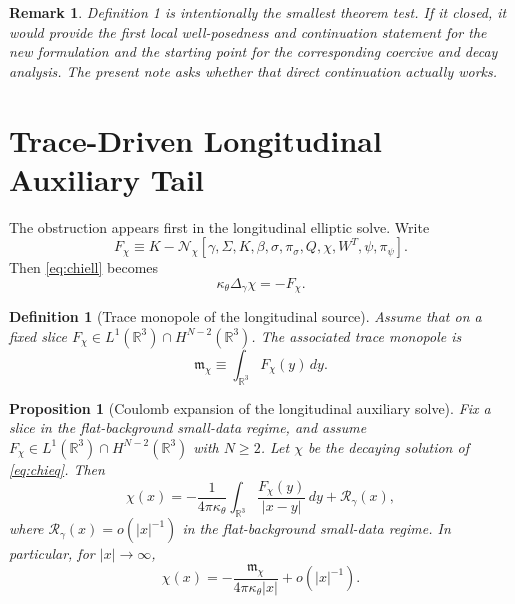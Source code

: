\documentclass[11pt]{article}
\newtheorem{definition}{Definition}
\newtheorem{proposition}{Proposition}
\newtheorem{remark}{Remark}
\begin{document}
\begin{remark}
Definition 1 is intentionally the smallest theorem test. If it closed, it would provide the first local well-posedness and continuation statement for the new formulation and the starting point for the corresponding coercive and decay analysis. The present note asks whether that direct continuation actually works.
\end{remark}

\section{Trace-Driven Longitudinal Auxiliary Tail}

The obstruction appears first in the longitudinal elliptic solve. Write
\begin{equation}
F_\chi
\equiv
K-\mathcal N_\chi[\gamma,\Sigma,K,\beta,\sigma,\pi_\sigma,Q,\chi,W^T,\psi,\pi_\psi].
\label{eq:Fchi}
\end{equation}
Then \eqref{eq:chiell} becomes
\begin{equation}
\kappa_\theta \Delta_\gamma \chi = -F_\chi.
\label{eq:chieq}
\end{equation}

\begin{definition}[Trace monopole of the longitudinal source]
Assume that on a fixed slice \(F_\chi \in L^1(\mathbb R^3)\cap H^{N-2}(\mathbb R^3)\). The associated \emph{trace monopole} is
\begin{equation}
\mathfrak m_\chi
\equiv
\int_{\mathbb R^3} F_\chi(y)\,dy.
\label{eq:mchi}
\end{equation}
\end{definition}

\begin{proposition}[Coulomb expansion of the longitudinal auxiliary solve]
\label{prop:coulomb}
Fix a slice in the flat-background small-data regime, and assume \(F_\chi \in L^1(\mathbb R^3)\cap H^{N-2}(\mathbb R^3)\) with \(N\ge 2\). Let \(\chi\) be the decaying solution of \eqref{eq:chieq}. Then
\begin{equation}
\chi(x)
=
-\frac{1}{4\pi\kappa_\theta}
\int_{\mathbb R^3}\frac{F_\chi(y)}{|x-y|}\,dy
+ \mathcal R_\gamma(x),
\label{eq:greenrep}
\end{equation}
where \(\mathcal R_\gamma(x)=o(|x|^{-1})\) in the flat-background small-data regime. In particular, for \(|x|\to\infty\),
\begin{equation}
\chi(x)
=
-\frac{\mathfrak m_\chi}{4\pi\kappa_\theta |x|}
+ o(|x|^{-1}).
\label{eq:chiasy}
\end{equation}
\end{proposition}
\end{document}
